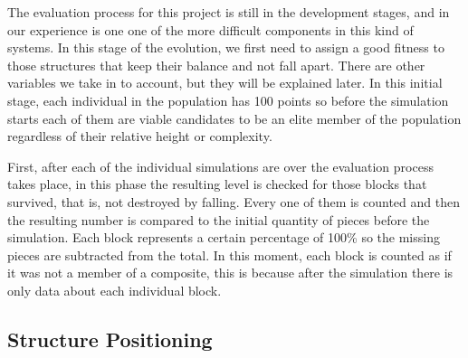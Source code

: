 \documentclass[conference]{IEEEtran}
\begin{document}
    The evaluation process for this project is still in the development stages,
    and in our experience is one one of the more difficult components in this
    kind of systems. In this stage of the evolution, we first need to assign a
    good fitness to those structures that keep their balance and not fall apart.
    There are other variables we take in to account, but they will be explained
    later. In this initial stage, each individual in the population has 100
    points so before the simulation starts each of them are viable candidates to
    be an elite %
    member of the population regardless of their relative height or
    complexity.
    
    First, after each of the individual simulations are over the evaluation process
    takes place, in this phase the resulting level is checked for those blocks that
    survived, that is,  not destroyed by falling. Every one
    of them is counted and then the resulting number is compared to the
    initial quantity of pieces  before the simulation. Each block represents a certain percentage of 100\% so the missing pieces 
    are subtracted from the total. In this moment, each block is counted as if 
    it was not a member of a composite, this is because after the simulation there is
    only data about each individual block. %

    \subsection{Structure Positioning}
\end{document}
